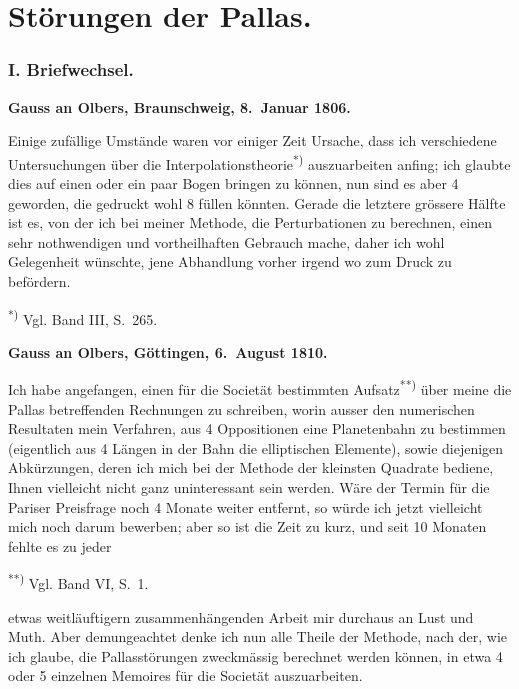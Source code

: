 \documentclass[12pt,a4paper]{article}
\begin{document}
\newpage
\setcounter{page}{421}
%
\part*{Störungen der Pallas.}

\newpage
\setcounter{page}{422}
\thispagestyle{empty}
\null
\newpage
\setcounter{page}{423}
%
\section*{I. Briefwechsel.}

\medskip\noindent
\textbf{Gauss an Olbers, Braunschweig, 8.~Januar 1806.}

Einige zufällige Umstände waren vor einiger Zeit Ursache, dass ich verschiedene Untersuchungen über die Interpolationstheorie\textsuperscript{*)} auszuarbeiten anfing; ich glaubte dies auf einen oder ein paar Bogen bringen zu können, nun sind es aber 4 geworden, die gedruckt wohl 8 füllen könnten. Gerade die letztere grössere Hälfte ist es, von der ich bei meiner Methode, die Perturbationen zu berechnen, einen sehr nothwendigen und vortheilhaften Gebrauch mache, daher ich wohl Gelegenheit wünschte, jene Abhandlung vorher irgend wo zum Druck zu befördern.

\smallskip\noindent\textsuperscript{*)} Vgl. Band III, S.~265.

\medskip\noindent
\textbf{Gauss an Olbers, Göttingen, 6.~August 1810.}

Ich habe angefangen, einen für die Societät bestimmten Aufsatz\textsuperscript{**)} über meine die Pallas betreffenden Rechnungen zu schreiben, worin ausser den numerischen Resultaten mein Verfahren, aus 4 Oppositionen eine Planetenbahn zu bestimmen (eigentlich aus 4 Längen in der Bahn die elliptischen Elemente), sowie diejenigen Abkürzungen, deren ich mich bei der Methode der kleinsten Quadrate bediene, Ihnen vielleicht nicht ganz uninteressant sein werden. Wäre der Termin für die Pariser Preisfrage noch 4 Monate weiter entfernt, so würde ich jetzt vielleicht mich noch darum bewerben; aber so ist die Zeit zu kurz, und seit 10 Monaten fehlte es zu jeder

\smallskip\noindent\textsuperscript{**)} Vgl. Band VI, S.~1.

\newpage
\setcounter{page}{424}
%
etwas weitläuftigern zusammenhängenden Arbeit mir durchaus an Lust und Muth. Aber demungeachtet denke ich nun alle Theile der Methode, nach der, wie ich glaube, die Pallasstörungen zweckmässig berechnet werden können, in etwa 4 oder 5 einzelnen Memoires für die Societät auszuarbeiten.
\end{document}
